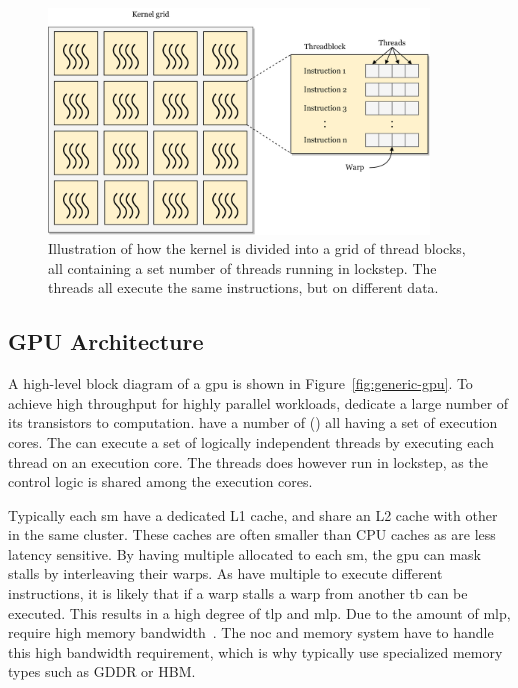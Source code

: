 
\begin{figure}
    \centering
    \includegraphics[width=0.9\textwidth]{figures/grid.png}
    \caption[Relating the kernel grid, warps and threads]{Illustration of how the kernel is divided into a grid of thread blocks, all containing a set number of threads running in lockstep. The threads all execute the same instructions, but on different data.}
    \label{fig:kernel_work_items}
\end{figure} 

\subsection{GPU Architecture}

A high-level block diagram of a \acrshort{gpu} is shown in Figure~\ref{fig:generic-gpu}. To achieve high throughput for highly parallel workloads,  dedicate a large number of its transistors to computation.  have a number of \textit{}() all having a set of execution cores. The  can execute a set of logically independent threads by executing each thread on an execution core. The threads does however run in lockstep, as the control logic is shared among the execution cores. 

Typically each \acrshort{sm} have a dedicated L1 cache, and share an L2 cache with other  in the same cluster. These caches are often smaller than CPU caches as  are less latency sensitive. By having multiple  allocated to each \acrshort{sm}, the \acrshort{gpu} can mask stalls by interleaving their warps. As  have multiple  to execute different instructions, it is likely that if a warp stalls a warp from another \acrshort{tb} can be executed. This results in a high degree of \acrfull{tlp} and \acrfull{mlp}. Due to the amount of \acrshort{mlp},  require high memory bandwidth~\cite{get_out_of_the_valley}. The \acrshort{noc} and memory system have to handle this high bandwidth requirement, which is why  typically use specialized memory types such as GDDR or HBM. 

